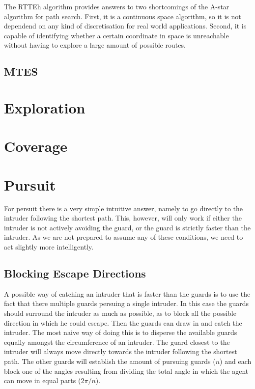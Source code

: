 \documentclass{report}
\begin{document}

			The RTTEh algorithm provides answers to two shortcomings of the A-star algorithm for path search. First, it is a continuous space algorithm, so it is not dependend on any kind of discretisation for real world applications. Second, it is capable of identifying whether a certain coordinate in space is unreachable without having to explore a large amount of possible routes.

		\subsection{MTES}
		

	\section{Exploration}

	\section{Coverage}

	\section{Pursuit}
		For persuit there is a very simple intuitive answer, namely to go directly to the intruder following the shortest path. This, however, will only work if either the intruder is not actively avoiding the guard, or the guard is strictly faster than the intruder. As we are not prepared to assume any of these conditions, we need to act slightly more intelligently.

		\subsection{Blocking Escape Directions}
			A possible way of catching an intruder that is faster than the guards is to use the fact that there multiple guards persuing a single intruder. In this case the guards should surround the intruder as much as possible, as to block all the possible direction in which he could escape. Then the guards can draw in and catch the intruder. The most naive way of doing this is to disperse the available guards equally amongst the circumference of an intruder. The guard closest to the intruder will always move directly towards the intruder following the shortest path. The other guards will establish the amount of pursuing guards ($n$) and each block one of the angles resulting from dividing the total angle in which the agent can move in equal parts ($2\pi / n$).
\end{document}
